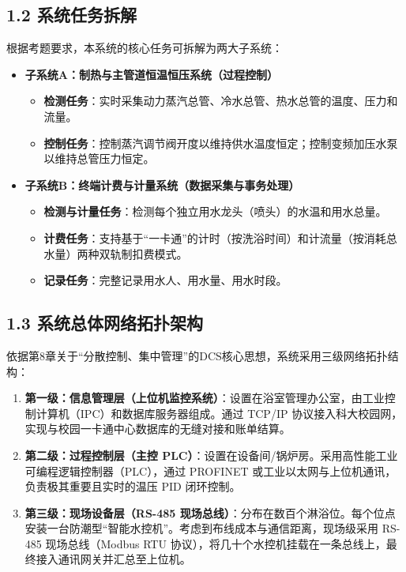 \documentclass[11pt,a4paper,UTF8]{ctexart}
\begin{document}
\subsection{1.2 系统任务拆解}
根据考题要求，本系统的核心任务可拆解为两大子系统：
\begin{itemize}
    \item \textbf{子系统A：制热与主管道恒温恒压系统（过程控制）}
    \begin{itemize}
        \item \textbf{检测任务}：实时采集动力蒸汽总管、冷水总管、热水总管的温度、压力和流量。
        \item \textbf{控制任务}：控制蒸汽调节阀开度以维持供水温度恒定；控制变频加压水泵以维持总管压力恒定。
    \end{itemize}
    \item \textbf{子系统B：终端计费与计量系统（数据采集与事务处理）}
    \begin{itemize}
        \item \textbf{检测与计量任务}：检测每个独立用水龙头（喷头）的水温和用水总量。
        \item \textbf{计费任务}：支持基于“一卡通”的计时（按洗浴时间）和计流量（按消耗总水量）两种双轨制扣费模式。
        \item \textbf{记录任务}：完整记录用水人、用水量、用水时段。
    \end{itemize}
\end{itemize}

\subsection{1.3 系统总体网络拓扑架构}
依据第8章关于“分散控制、集中管理”的DCS核心思想，系统采用三级网络拓扑结构：
\begin{enumerate}
    \item \textbf{第一级：信息管理层（上位机监控系统）}：设置在浴室管理办公室，由工业控制计算机（IPC）和数据库服务器组成。通过 TCP/IP 协议接入科大校园网，实现与校园一卡通中心数据库的无缝对接和账单结算。
    \item \textbf{第二级：过程控制层（主控 PLC）}：设置在设备间/锅炉房。采用高性能工业可编程逻辑控制器（PLC），通过 PROFINET 或工业以太网与上位机通讯，负责极其重要且实时的温压 PID 闭环控制。
    \item \textbf{第三级：现场设备层（RS-485 现场总线）}：分布在数百个淋浴位。每个位点安装一台防潮型“智能水控机”。考虑到布线成本与通信距离，现场级采用 RS-485 现场总线（Modbus RTU 协议），将几十个水控机挂载在一条总线上，最终接入通讯网关并汇总至上位机。
\end{enumerate}
\end{document}
